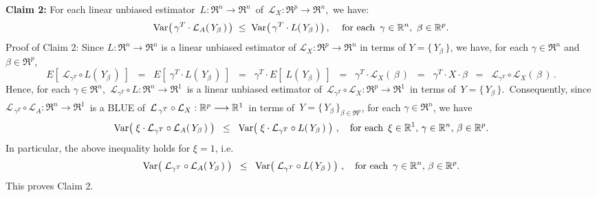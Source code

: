 \vskip 0.5cm
\noindent
\textbf{Claim 2:}\quad
For each linear unbiased estimator
\,$L : \Re^{n} \longrightarrow \Re^{n}$\,
of
\,$\mathcal{L}_{X} : \Re^{p} \longrightarrow \Re^{n}$,\,
we have:
\begin{equation*}
\textnormal{Var}\!\left(\,\gamma^{T}\cdot\mathcal{L}_{A}(\,Y_{\beta}\,)\,\right)
\;\leq\;
	\textnormal{Var}\!\left(\,\gamma^{T} \cdot L(\,Y_{\beta}\,)\,\right),\,
\quad
\textnormal{for each \,$\gamma\in\mathbb{R}^{n}$, \,$\beta\in\mathbb{R}^{p}$}.
\end{equation*}
\vskip 0.1cm
\noindent
Proof of Claim 2:\quad
Since $L : \Re^{n} \longrightarrow \Re^{n}$ is a linear unbiased estimator of
$\mathcal{L}_{X} : \Re^{p} \longrightarrow \Re^{n}$ in terms of $Y = \{\,Y_{\beta}\,\}$,
we have, for each $\gamma \in \Re^{n}$ and $\beta \in \Re^{p}$,
\begin{equation*}
E\!\left[\;\mathcal{L}_{\gamma^{T}} \circ L(\,Y_{\beta}\,)\;\right]
\;\; = \;\; E\!\left[\;\gamma^{T} \cdot L(\,Y_{\beta}\,)\;\right]
\;\; = \;\; \gamma^{T} \cdot E\!\left[\;L(\,Y_{\beta}\,)\;\right]
\;\; = \;\; \gamma^{T} \cdot \mathcal{L}_{X}(\,\beta\,)
\;\; = \;\; \gamma^{T} \cdot X \cdot \beta
\;\; = \;\; \mathcal{L}_{\gamma^{T}} \circ \mathcal{L}_{X} (\,\beta\,)\,.
\end{equation*}
Hence, for each $\gamma \in \Re^{n}$,
\,$\mathcal{L}_{\gamma^{T}} \circ L : \Re^{n} \longrightarrow \Re^{1}$\,
is a linear unbiased estimator of 
\,$\mathcal{L}_{\gamma^{T}} \circ \mathcal{L}_{X} : \Re^{p} \longrightarrow \Re^{1}$\,
in terms of \,$Y = \{\,Y_{\beta}\,\}$.\,
Consequently, since
\,$\mathcal{L}_{\,\gamma^{T}} \circ \mathcal{L}_{A} : \Re^{n} \longrightarrow \Re^{1}$\,
is a BLUE of
\,$\overset{{\color{white}+}}{\mathcal{L}}_{\,\gamma^{T}} \circ \mathcal{L}_{X} : \Re^{p} \longrightarrow \Re^{1}$\,
in terms of
\,$Y = \{\,Y_{\beta}\,\}_{\beta\in\Re^{p}}$, for each $\gamma\in\Re^{n}$,
we have
\begin{equation*}
\textnormal{Var}\!\left(\;\xi\cdot\mathcal{L}_{\gamma^{T}}\circ\mathcal{L}_{A}(\,Y_{\beta}\,)\;\right)
\;\; \leq \;\;
	\textnormal{Var}\!\left(\;\xi\cdot\mathcal{L}_{\gamma^{T}}\circ L(\,Y_{\beta}\,)\;\right)\,,
\quad
\textnormal{for each \,$\xi \in \mathbb{R}^{1},\, \gamma\in\mathbb{R}^{n},\, \beta\in\mathbb{R}^{p}$}.
\end{equation*}
In particular, the above inequality holds for $\xi = 1$, i.e.
\begin{equation*}
\textnormal{Var}\!\left(\;\mathcal{L}_{\gamma^{T}}\circ\mathcal{L}_{A}(\,Y_{\beta}\,)\;\right)
\;\; \leq \;\;
	\textnormal{Var}\!\left(\;\mathcal{L}_{\gamma^{T}}\circ L(\,Y_{\beta}\,)\;\right)\,,
\quad
\textnormal{for each \,$\gamma\in\mathbb{R}^{n},\, \beta\in\mathbb{R}^{p}$}.
\end{equation*}
This proves Claim 2.

